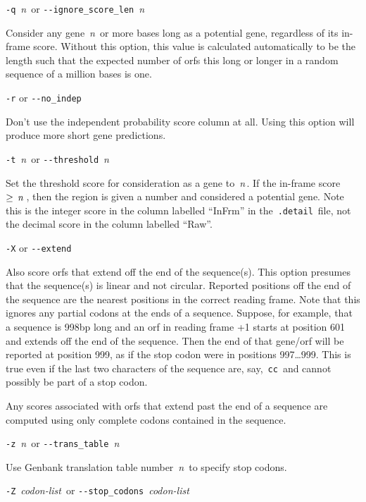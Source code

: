 \documentclass[fleqn,titlepage,11pt]{article}
\def\Desc#1{\,\mbox{\emph{#1}}\,}
\begin{document}
\exdent
  \verb`-q` \Desc{n} \enskip or \enskip \verb`--ignore_score_len` \Desc{n}

  Consider any gene \Desc{n} or more bases long as a potential
  gene, regardless of its in-frame score.
  Without this option, this value is calculated automatically to
  be the length such that the expected number of orfs this long
  or longer in a random sequence of a million bases is one.

\exdent
  \verb`-r` \enskip or \enskip \verb`--no_indep`

  Don't use the independent probability score column at all.  Using
  this option will produce more short gene predictions.

\exdent
  \verb`-t` \Desc{n} \enskip or \enskip \verb`--threshold` \Desc{n}

  Set the threshold score for consideration as a gene to \Desc{n}.
  If the in-frame
  score $\ge \Desc{n}$, then the region is given a number and considered
  a potential gene.  Note this is the integer score in the column labelled
  ``InFrm'' in the \,\verb`.detail`\, file, not the decimal score in
  the column labelled ``Raw''.

\exdent
  \verb`-X` \enskip or \enskip \verb`--extend`

  Also score orfs that extend off the end of the sequence(s).  This
  option presumes that the sequence(s) is linear and not circular.
  Reported positions off the end of the sequence are the nearest
  positions in the correct reading frame.  Note that this ignores
  any partial codons at the ends of a sequence.  Suppose, for example,
  that a sequence is 998bp long and an orf in reading frame +1
  starts at position 601 and extends off the end of the sequence.
  Then the end of that gene/orf will be reported at position 999,
  as if the stop codon were in positions 997\ldots999.  This is true
  even if the last two characters of the sequence are, say, \,\verb`cc`\,
  and cannot possibly be part of a stop codon.

  Any scores associated with orfs that extend past the end of a
  sequence are computed using only complete codons contained in
  the sequence.
  
\exdent
  \verb`-z` \Desc{n} \enskip or \enskip \verb`--trans_table` \Desc{n}

  Use Genbank translation table number \Desc{n} to specify stop codons.

\exdent
  \verb`-Z` \Desc{codon-list} \enskip or \enskip \verb`--stop_codons` \Desc{codon-list}
\end{document}
